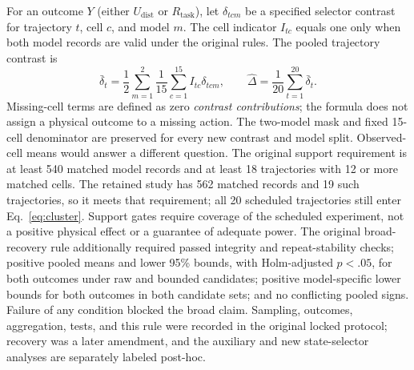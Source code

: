 \documentclass{article}
\begin{document}
For an outcome $Y$ (either $U_{\mathrm{dist}}$ or $R_{\mathrm{task}}$), let
$\delta_{tcm}$ be a specified selector contrast for trajectory $t$, cell $c$,
and model $m$. The cell indicator $I_{tc}$ equals one only when both model
records are valid under the original rules. The pooled trajectory contrast is
\begin{equation}
 \bar\delta_t=\frac{1}{2}\sum_{m=1}^{2}
          \frac{1}{15}\sum_{c=1}^{15} I_{tc}\delta_{tcm},
 \qquad \widehat\Delta=\frac{1}{20}\sum_{t=1}^{20}\bar\delta_t.
 \label{eq:cluster}
\end{equation}
Missing-cell terms are defined as zero \emph{contrast contributions}; the
formula does not assign a physical outcome to a missing action. The two-model
mask and fixed 15-cell denominator are preserved for every new contrast and
model split. Observed-cell means would answer a different question.
The original support requirement is at least 540 matched model records and
at least 18 trajectories with 12 or more matched cells. The retained study
has 562 matched records and 19 such trajectories, so it meets that requirement;
all 20 scheduled trajectories still enter Eq.~\ref{eq:cluster}.
Support gates require coverage of the scheduled experiment, not a positive
physical effect or a guarantee of adequate power. The original broad-recovery
rule additionally required passed integrity and repeat-stability checks;
positive pooled means and lower 95\% bounds, with Holm-adjusted $p<.05$, for
both outcomes under raw and bounded candidates; positive model-specific lower
bounds for both outcomes in both candidate sets; and no conflicting pooled
signs. Failure of any condition blocked the broad claim. Sampling, outcomes,
aggregation, tests, and this rule were recorded in the original locked protocol;
recovery was a later amendment, and the auxiliary and new state-selector
analyses are separately labeled post-hoc.
\end{document}

